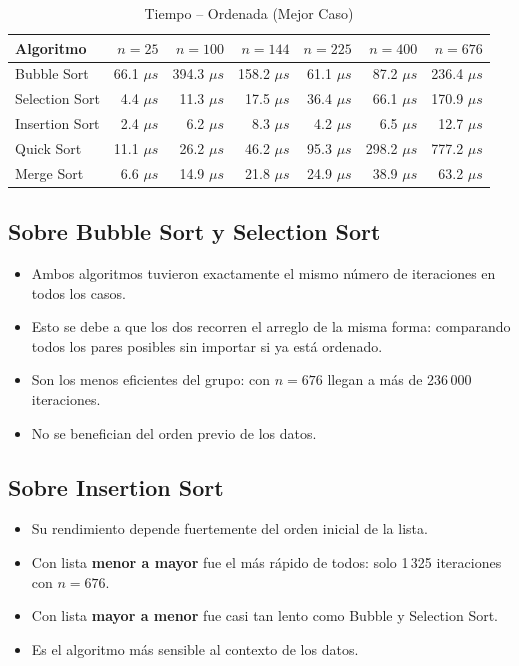 \documentclass[12pt]{article}
\begin{document}
\begin{table}[H]
\centering
\caption{Tiempo -- Ordenada (Mejor Caso)}
\begin{tabular}{lrrrrrr}
\toprule
\textbf{Algoritmo} & \textbf{$n=25$} & \textbf{$n=100$} & \textbf{$n=144$} & \textbf{$n=225$} & \textbf{$n=400$} & \textbf{$n=676$} \\
\midrule
Bubble Sort    & 66.1 $\mu s$ & 394.3 $\mu s$ & 158.2 $\mu s$ & 61.1 $\mu s$  & 87.2 $\mu s$  & 236.4 $\mu s$ \\
Selection Sort & 4.4 $\mu s$  & 11.3 $\mu s$  & 17.5 $\mu s$  & 36.4 $\mu s$  & 66.1 $\mu s$  & 170.9 $\mu s$ \\
Insertion Sort & 2.4 $\mu s$  & 6.2 $\mu s$   & 8.3 $\mu s$   & 4.2 $\mu s$   & 6.5 $\mu s$   & 12.7 $\mu s$  \\
Quick Sort     & 11.1 $\mu s$ & 26.2 $\mu s$  & 46.2 $\mu s$  & 95.3 $\mu s$  & 298.2 $\mu s$ & 777.2 $\mu s$ \\
Merge Sort     & 6.6 $\mu s$  & 14.9 $\mu s$  & 21.8 $\mu s$  & 24.9 $\mu s$  & 38.9 $\mu s$  & 63.2 $\mu s$  \\
\bottomrule
\end{tabular}
\end{table}

\subsection*{Sobre Bubble Sort y Selection Sort}

\begin{itemize}
    \item Ambos algoritmos tuvieron exactamente el mismo número de iteraciones en todos los casos.
    \item Esto se debe a que los dos recorren el arreglo de la misma forma: comparando todos los pares posibles sin importar si ya está ordenado.
    \item Son los menos eficientes del grupo: con $n=676$ llegan a más de 236\,000 iteraciones.
    \item No se benefician del orden previo de los datos.
\end{itemize}

\subsection*{Sobre Insertion Sort}

\begin{itemize}
    \item Su rendimiento depende fuertemente del orden inicial de la lista.
    \item Con lista \textbf{menor a mayor} fue el más rápido de todos: solo 1\,325 iteraciones con $n=676$.
    \item Con lista \textbf{mayor a menor} fue casi tan lento como Bubble y Selection Sort.
    \item Es el algoritmo más sensible al contexto de los datos.
\end{itemize}
\end{document}
